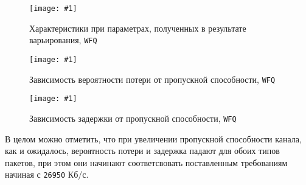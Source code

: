 \documentclass[12pt, a4paper]{article}
\newcommand{\figc}[4]{
  \begin{figure}[H]
  \begin{center}
    \texttt{[image: \#1]}
    \caption{#2}
    \label{fig:#3}
  \end{center}
  \end{figure}
}
\begin{document}
\figc{wfq/C26_95E10WFQ}{Характеристики при параметрах, полученных в результате варьирования, \texttt{WFQ}}{w_c}{1.0}
\figc{charts/wfq_loss}{Зависимость вероятности потери от пропускной способности, \texttt{WFQ}}{w_l}{0.8}
\figc{charts/wfq_delay}{Зависимость задержки от пропускной способности, \texttt{WFQ}}{w_d}{0.8}

В целом можно отметить, что при увеличении пропускной способности канала, как
и ожидалось, вероятность потери и задержка падают для обоих типов пакетов,
при этом они начинают соответсвовать поставленным требованиям начиная с \texttt{26950} Кб/с.
\end{document}
